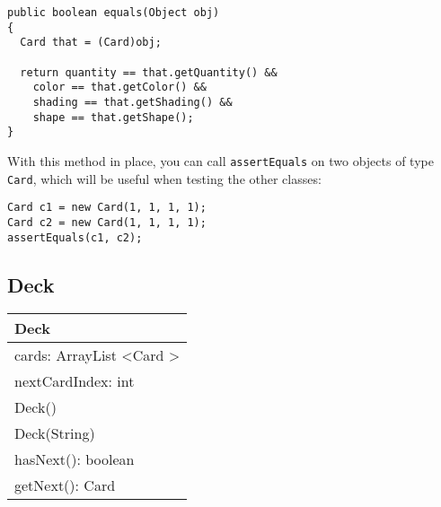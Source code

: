 \documentclass[11pt]{article}
\begin{document}
\begin{itemize}
{\footnotesize
\begin{verbatim}
public boolean equals(Object obj)
{
  Card that = (Card)obj;
    
  return quantity == that.getQuantity() &&
    color == that.getColor() &&
    shading == that.getShading() &&
    shape == that.getShape();
}
\end{verbatim}}

  With this method in place, you can call {\tt assertEquals} on two objects of
  type {\tt Card}, which will be useful when testing the other classes:

{\footnotesize
\begin{verbatim}
Card c1 = new Card(1, 1, 1, 1);
Card c2 = new Card(1, 1, 1, 1);
assertEquals(c1, c2);
\end{verbatim}}
\end{itemize}

\subsection*{Deck}

\begin{tabular}{|l|}
\hline
Deck \\
\hline
cards: ArrayList \textless Card \textgreater \\
nextCardIndex: int\\
\hline
Deck()\\
Deck(String)\\
hasNext(): boolean \\
getNext(): Card\\
\hline
\end{tabular}
\end{document}
